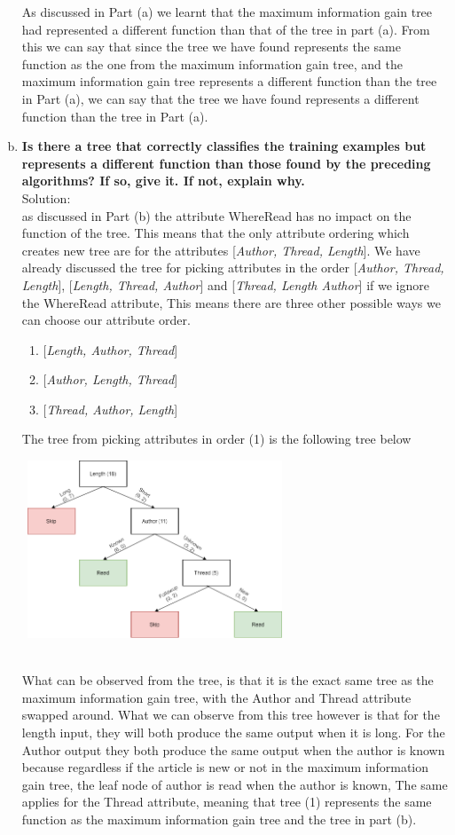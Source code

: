 \documentclass{article}
\begin{document}
\begin{enumerate}[(a)]
As discussed in Part (a) we learnt that the maximum information gain tree had represented a different function than that of the tree in part (a). From this we can say that since the tree we have found represents the same function as the one from the maximum information gain tree, and the maximum information gain tree represents a different function than the tree in Part (a), we can say that the tree we have found represents a different function than the tree in Part (a).
\newpage
\item \textbf{Is there a tree that correctly classifies the training examples but represents a different function than those found by the preceding algorithms? If so, give it. If not, explain why.}\\Solution:\\
as discussed in Part (b) the attribute WhereRead has no impact on the function of the tree. This means that the only attribute ordering which creates new tree are for the attributes [\emph{Author, Thread, Length}]. We have already discussed the tree for picking attributes in the order [\emph{Author, Thread, Length}], [\emph{Length, Thread, Author}] and [\emph{Thread, Length Author}] if  we ignore the WhereRead attribute, This means there are three other possible ways we can choose our attribute order.
    \begin{enumerate}[(1)]
        \item{[\emph{Length, Author, Thread}]}
        \item{[\emph{Author, Length, Thread}]}
        \item{[\emph{Thread, Author, Length}]}
    \end{enumerate}
The tree from picking attributes in order (1) is the following tree below
\begin{center}
\includegraphics[width=300px,height=200px]{tree3.png}
\end{center}\\
What can be observed from the tree, is that it is the exact same tree as the maximum information gain tree, with the Author and Thread attribute swapped around. What we can observe from this tree however is that for the length input, they will both produce the same output when it is long. For the Author output they both produce the same output when the author is known because regardless if the article is new or not in the maximum information gain tree, the leaf node of author is read when the author is known, The same applies for the Thread attribute, meaning that tree (1) represents the same function as the maximum information gain tree and the tree in part (b).\\

\end{enumerate}
\end{document}
